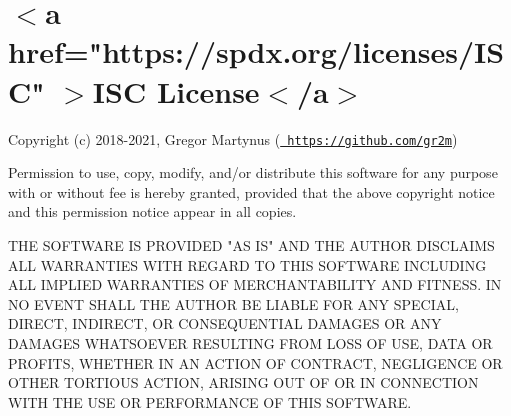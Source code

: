 \chapter{\texorpdfstring{$<$}{<}a href="{}https\+://spdx.\+org/licenses/\+ISC"{} \texorpdfstring{$>$}{>}ISC License\texorpdfstring{$<$}{<}/a\texorpdfstring{$>$}{>}}
\hypertarget{md_node__modules_2universal-user-agent_2_l_i_c_e_n_s_e}{}\label{md_node__modules_2universal-user-agent_2_l_i_c_e_n_s_e}
\label{md_node__modules_2universal-user-agent_2_l_i_c_e_n_s_e_autotoc_md34478}%
%


Copyright (c) 2018-\/2021, Gregor Martynus (\href{https://github.com/gr2m}{\texttt{ https\+://github.\+com/gr2m}})

Permission to use, copy, modify, and/or distribute this software for any purpose with or without fee is hereby granted, provided that the above copyright notice and this permission notice appear in all copies.

THE SOFTWARE IS PROVIDED "{}\+AS IS"{} AND THE AUTHOR DISCLAIMS ALL WARRANTIES WITH REGARD TO THIS SOFTWARE INCLUDING ALL IMPLIED WARRANTIES OF MERCHANTABILITY AND FITNESS. IN NO EVENT SHALL THE AUTHOR BE LIABLE FOR ANY SPECIAL, DIRECT, INDIRECT, OR CONSEQUENTIAL DAMAGES OR ANY DAMAGES WHATSOEVER RESULTING FROM LOSS OF USE, DATA OR PROFITS, WHETHER IN AN ACTION OF CONTRACT, NEGLIGENCE OR OTHER TORTIOUS ACTION, ARISING OUT OF OR IN CONNECTION WITH THE USE OR PERFORMANCE OF THIS SOFTWARE. 